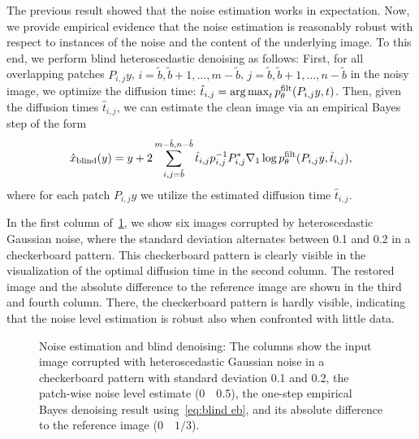 The previous result showed that the noise estimation works in expectation.
Now, we provide empirical evidence that the noise estimation is reasonably robust with respect to instances of the noise and the content of the underlying image.
To this end, we perform blind heteroscedastic denoising as follows:
First, for all overlapping patches \( P_{i, j} y \), \( i = \tilde{b}, \tilde{b} + \num{1}, \dotsc, m - \tilde{b} \), \( j = \tilde{b}, \tilde{b} + \num{1}, \dotsc, n - \tilde{b} \) in the noisy image, we optimize the diffusion time: \( \hat{t}_{i, j} = \operatorname*{arg\,max}_t p^{\mathrm{filt}}_\theta(P_{i, j} y, t) \).
Then, given the diffusion times \( \hat{t}_{i, j} \), we can estimate the clean image via an empirical Bayes step of the form
\begin{equation}
	\hat{x}_{\mathrm{blind}}(y) = y + \num{2} \sum_{i,j=\tilde{b}}^{m-\tilde{b}, n - \tilde{b}} \hat{t}_{i, j}  p_{i, j}^{-1} P_{i, j}^{\ast} \nabla_{1} \log p^{\mathrm{filt}}_\theta(P_{i, j} y, \hat{t}_{i, j}),
	\label{eq:blind eb}
\end{equation}
where for each patch \( P_{i, j} y \) we utilize the estimated diffusion time \( \hat{t}_{i, j} \).

In the first column of~\cref{fig:blind denosing}, we show six images corrupted by heteroscedastic Gaussian noise, where the standard deviation alternates between \num{0.1} and \num{0.2} in a checkerboard pattern.
This checkerboard pattern is clearly visible in the visualization of the optimal diffusion time in the second column.
The restored image and the absolute difference to the reference image are shown in the third and fourth column.
There, the checkerboard pattern is hardly visible, indicating that the noise level estimation is robust also when confronted with little data.
\begin{figure}
	\centering
	\caption[Noise estimation and blind denoising]{%
		Noise estimation and blind denoising:
		The columns show the input image corrupted with heteroscedastic Gaussian noise in a checkerboard pattern with standard deviation \num{0.1} and \num{0.2}, the patch-wise noise level estimate (\num{0}~\protect\drawcolorbarbw~\num{0.5}), the one-step empirical Bayes denoising result using~\eqref{eq:blind eb}, and its absolute difference to the reference image (\num{0}~\protect\drawcolorbar~\(\num{1}/\num{3}\)).
	}%
	\label{fig:blind denosing}
\end{figure}

